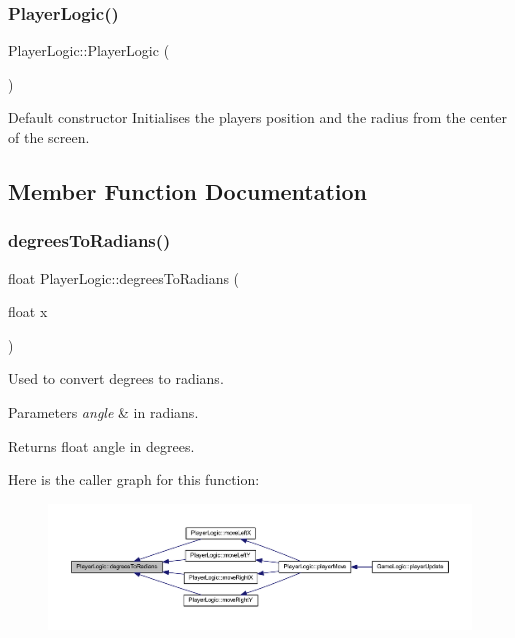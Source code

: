 \subsubsection{\texorpdfstring{Player\+Logic()}{PlayerLogic()}}
{\footnotesize\ttfamily Player\+Logic\+::\+Player\+Logic (\begin{DoxyParamCaption}{ }\end{DoxyParamCaption})}

Default constructor Initialises the players position and the radius from the center of the screen. 

\subsection{Member Function Documentation}
\mbox{\label{class_player_logic_a425e0b7a5a4495958a41383525f059eb}} 
\subsubsection{\texorpdfstring{degrees\+To\+Radians()}{degreesToRadians()}}
{\footnotesize\ttfamily float Player\+Logic\+::degrees\+To\+Radians (\begin{DoxyParamCaption}\item[{float}]{x }\end{DoxyParamCaption})}



Used to convert degrees to radians. 


\begin{DoxyParams}{Parameters}
{\em angle} & in radians. \\
\hline
\end{DoxyParams}
\begin{DoxyReturn}{Returns}
float angle in degrees. 
\end{DoxyReturn}
Here is the caller graph for this function\+:
\nopagebreak
\begin{figure}[H]
\begin{center}
\leavevmode
\includegraphics[width=350pt]{class_player_logic_a425e0b7a5a4495958a41383525f059eb_icgraph}
\end{center}
\end{figure}
\mbox{\label{class_player_logic_a692b3e5b8f5b052e28dbb0fdb7dc634c}} 
